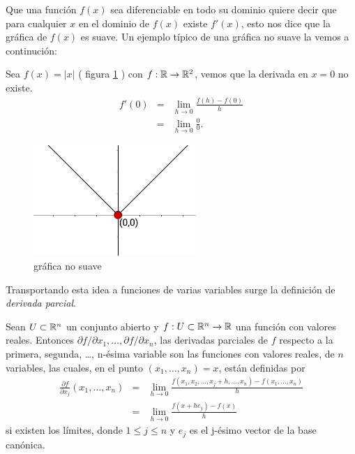 Que una función $f(x)$ sea diferenciable en todo su dominio quiere decir que para cualquier $x$ en el dominio de $f(x)$ existe
$f'(x)$, esto nos dice que la gráfica de $f(x)$ es suave. Un ejemplo típico 
de una gráfica no suave la vemos a continuci\'on:

\begin{example}
    Sea $f(x) = |x|$ ( figura \ref{fig:no-derivative} ) con $f:\mathbb{R} \rightarrow \mathbb{R}^{2}$, vemos que la derivada en $x=0$ no existe.
    \begin{eqnarray*}
        f'(0) &=& \lim_{h \rightarrow 0} \frac{f(h) - f(0)}{h} \\
              &=& \lim_{h \rightarrow 0} \frac{0}{0} \text{.}
    \end{eqnarray*}
\end{example}

\begin{figure}[!ht]
  \begin{center}
      \includegraphics[width=0.55\textwidth]{gfx/grafica-abs}
      \caption{gráfica no suave}
      \label{fig:no-derivative}
  \end{center}
\end{figure}

Transportando esta idea a funciones de varias variables surge la definición de \emph{derivada parcial}.

\begin{definition}
    Sean $U \subset \mathbb{R}^{n}$ un conjunto abierto y $f:U \subset \mathbb{R}^{n} \rightarrow \mathbb{R}$ una función con valores reales. Entonces $\partial f/\partial x_{1},
    \ldots, \partial f/ \partial x_{n}$, las derivadas parciales de $f$ respecto a la primera, segunda, \dots, n-ésima variable son las funciones con valores
    reales, de $n$ variables, las cuales, en el punto $(x_{1},\ldots,x_{n}) = x$, están definidas por
    \begin{eqnarray*}
        \frac{\partial f}{\partial x_{j}} (x_{1},\ldots,x_{n}) &=& \lim_{h \rightarrow 0} \frac{f(x_{1},x_{2},\ldots,x_{j} + h,\ldots,x_{n}) - f(x_{1},\ldots,x_{n})}{h} \\
                                                               &=& \lim_{h \rightarrow 0} \frac{f(x+he_{j})-f(x)}{h} 
    \end{eqnarray*}
    si existen los límites, donde $1 \le j \le n$ y $e_{j}$ es el j-ésimo vector de la base canónica.
\end{definition}


